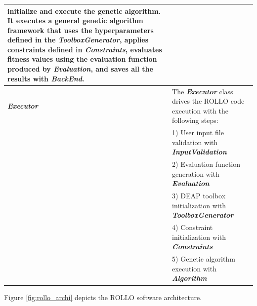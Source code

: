 \begin{table}[]
\begin{tabular}{l|p{}}
    initialize and execute the genetic algorithm. It executes a general genetic 
    algorithm framework that uses the hyperparameters defined in the 
    \textbf{\textit{ToolboxGenerator}}, applies constraints defined in
    \textbf{\textit{Constraints}}, evaluates fitness values using the evaluation 
    function produced by \textbf{\textit{Evaluation}}, and saves all the results 
    with \textbf{\textit{BackEnd}}. \\
    \hline
    \textbf{\textit{Executor}} & The \textbf{\textit{Executor}} class drives the \gls{ROLLO} code
    execution with the following steps: \\
    & 1) User input file validation with \textbf{\textit{InputValidation}} \\
    & 2) Evaluation function generation with \textbf{\textit{Evaluation}} \\
    & 3) \gls{DEAP} toolbox initialization with \textbf{\textit{ToolboxGenerator}} \\ 
    & 4) Constraint initialization with \textbf{\textit{Constraints}} \\ 
    & 5) Genetic algorithm execution with \textbf{\textit{Algorithm}} \\
    \hline
    \end{tabular}
    \end{table}
Figure \ref{fig:rollo_archi} depicts the \gls{ROLLO} software architecture. 
